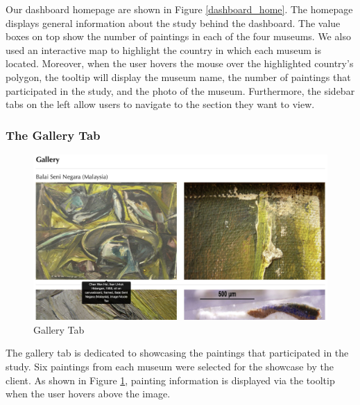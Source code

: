 \documentclass[11pt, oneside]{article}
\begin{document}
Our dashboard homepage are shown in Figure \ref{dashboard_home}. The homepage displays general information about the study behind the dashboard. The value boxes on top show the number of paintings in each of the four museums. We also used an interactive map to highlight the country in which each museum is located. Moreover, when the user hovers the mouse over the highlighted country's polygon, the tooltip will display the museum name, the number of paintings that participated in the study, and the photo of the museum. Furthermore, the sidebar tabs on the left allow users to navigate to the section they want to view.

\subsubsection{The Gallery Tab}
\begin{figure}[H]
    \centering
    \includegraphics[scale=0.16]{images/gallery_tab.jpeg}
    \caption{Gallery Tab}
    \label{gallery_tab}
\end{figure}
The gallery tab is dedicated to showcasing the paintings that participated in the study. Six paintings from each museum were selected for the showcase by the client. As shown in Figure \ref{gallery_tab}, painting information is displayed via the tooltip when the user hovers above the image.
\end{document}
